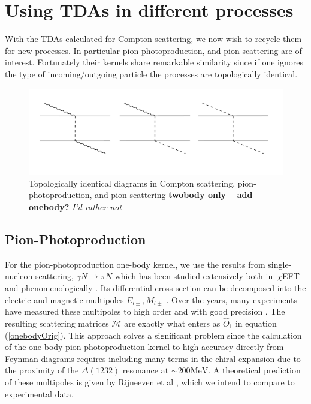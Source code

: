 \documentclass[a4paper,11pt]{article}
\newcommand{\ques}[1]{\color{red}\textit{ #1 }\color{black}}
\newcommand{\com}[1]{\color{blue}\small\textbf{ #1 }\color{black}\normalsize}
\newcommand{\MeV}{\mathrm{MeV}}
\newcommand{\ChiEFT}{\,$\chi$EFT\,\,}
\begin{document}
\section{Using TDAs in different processes}
With the TDAs calculated for Compton scattering, we now wish to recycle them for new processes.
In particular pion-photoproduction, and
pion scattering are of interest.
Fortunately their kernels share remarkable similarity since if one ignores the type of incoming/outgoing 
particle the processes are topologically identical.
\begin{figure}[H]
\centering
\includegraphics[scale=0.5]{KernelSim.pdf}
\caption{Topologically identical diagrams in Compton scattering, pion-photoproduction, and pion scattering \com{twobody only -- add onebody?}\ques{I'd rather not}}
\end{figure}
\subsection{Pion-Photoproduction}
For the pion-photoproduction one-body kernel, we use the results from
single-nucleon scattering, $\gamma N \to \pi N$ which has
been studied extensively both in \ChiEFT and phenomenologically \cite{pionphoto,
Rijneveen2021,Workman2012,Briscoe2023}.
Its differential cross section can be decomposed into the
electric and magnetic multipoles $E_{l\pm}, M_{l\pm}$ \cite{pionphoto}.
Over the years, many experiments have measured
these multipoles to high order and with good precision
\cite{multipolePionPion}.
The resulting scattering matrices $\mathcal{M}$ are exactly what
enters as $\hat{O}_1$ in equation (\ref{onebodyOrig}).
This approach solves a significant problem since the calculation of
the one-body pion-photoproduction kernel
to high accuracy directly from Feynman diagrams requires including many terms
in the chiral expansion due to the proximity of the $\Delta(1232)$ resonance at $\sim 200\MeV$.
A theoretical prediction of these multipoles is given by Rijneeven et al \cite{Rijneveen2021}, which we intend to compare 
to experimental data.
\end{document}
